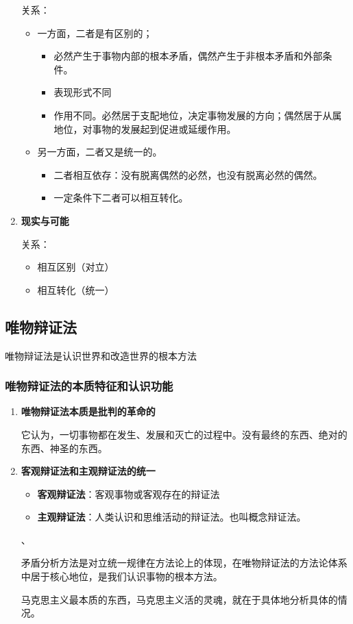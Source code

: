 \documentclass[12pt, a4paper, oneside]{ctexart}
\begin{document}
\begin{enumerate}
  关系：
  \begin{itemize}
    \item 一方面，二者是有区别的；
    \begin{itemize}
      \item 必然产生于事物内部的根本矛盾，偶然产生于非根本矛盾和外部条件。
      \item 表现形式不同
      \item 作用不同。必然居于支配地位，决定事物发展的方向；偶然居于从属地位，对事物的发展起到促进或延缓作用。
    \end{itemize}
    \item 另一方面，二者又是统一的。
    \begin{itemize}
      \item 二者相互依存：没有脱离偶然的必然，也没有脱离必然的偶然。
      \item 一定条件下二者可以相互转化。
    \end{itemize}
  \end{itemize}
  \item {\bf 现实与可能}
  
  关系：
  \begin{itemize}
    \item 相互区别（对立）
    \item 相互转化（统一）
  \end{itemize}
\end{enumerate}

\subsection{唯物辩证法}

唯物辩证法是认识世界和改造世界的根本方法

\subsubsection{唯物辩证法的本质特征和认识功能}

\begin{enumerate}
  \item {\bf 唯物辩证法本质是批判的革命的}
  
  它认为，一切事物都在发生、发展和灭亡的过程中。没有最终的东西、绝对的东西、神圣的东西。

  \item {\bf 客观辩证法和主观辩证法的统一}
  
  \begin{itemize}
    \item {\bf 客观辩证法}：客观事物或客观存在的辩证法
    \item {\bf 主观辩证法}：人类认识和思维活动的辩证法。也叫概念辩证法。
  \end{itemize}、
  
  矛盾分析方法是对立统一规律在方法论上的体现，在唯物辩证法的方法论体系中居于核心地位，是我们认识事物的根本方法。

  马克思主义最本质的东西，马克思主义活的灵魂，就在于具体地分析具体的情况。

\end{enumerate}
\end{document}
